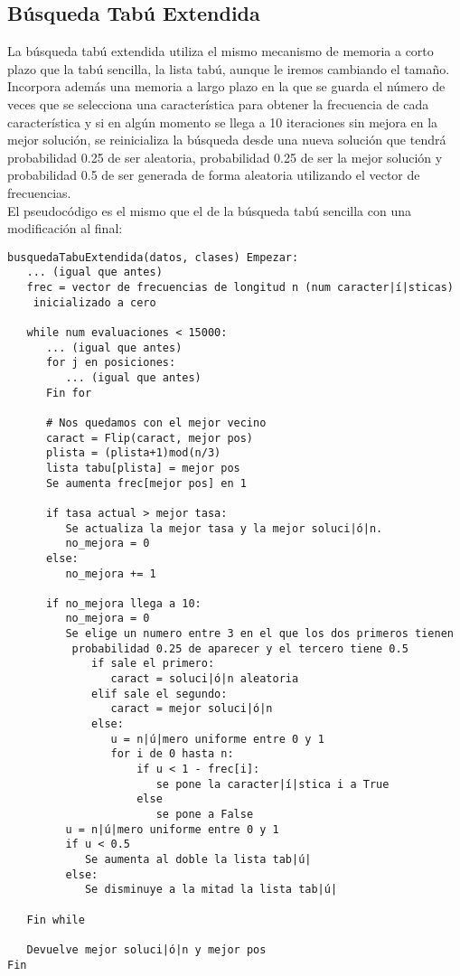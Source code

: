 \documentclass[12pt]{article}
\begin{document}
\subsection{Búsqueda Tabú Extendida}
La búsqueda tabú extendida utiliza el mismo mecanismo de memoria a corto plazo que la tabú sencilla, la lista tabú, aunque le iremos cambiando el tamaño. Incorpora además una memoria a largo plazo en la que se guarda el número de veces que se selecciona una característica para obtener la frecuencia de cada característica y si en algún momento se llega a 10 iteraciones sin mejora en la mejor solución, se reinicializa la búsqueda desde una nueva solución que tendrá probabilidad 0.25 de ser aleatoria, probabilidad 0.25 de ser la mejor solución y probabilidad 0.5 de ser generada de forma aleatoria utilizando el vector de frecuencias.\\

El pseudocódigo es el mismo que el de la búsqueda tabú sencilla con una modificación al final:

\begin{lstlisting}
busquedaTabuExtendida(datos, clases) Empezar:
   ... (igual que antes)
   frec = vector de frecuencias de longitud n (num caracter|í|sticas)
    inicializado a cero

   while num evaluaciones < 15000:
      ... (igual que antes)
      for j en posiciones:
         ... (igual que antes)
      Fin for
   
      # Nos quedamos con el mejor vecino
      caract = Flip(caract, mejor pos)
      plista = (plista+1)mod(n/3)
      lista tabu[plista] = mejor pos
      Se aumenta frec[mejor pos] en 1   
   
      if tasa actual > mejor tasa:
         Se actualiza la mejor tasa y la mejor soluci|ó|n.
         no_mejora = 0
      else:
         no_mejora += 1
   
      if no_mejora llega a 10:
         no_mejora = 0
         Se elige un numero entre 3 en el que los dos primeros tienen
          probabilidad 0.25 de aparecer y el tercero tiene 0.5
             if sale el primero:
                caract = soluci|ó|n aleatoria
             elif sale el segundo:
                caract = mejor soluci|ó|n
             else:
                u = n|ú|mero uniforme entre 0 y 1
                for i de 0 hasta n:
                    if u < 1 - frec[i]:
                       se pone la caracter|í|stica i a True
                    else
                       se pone a False
         u = n|ú|mero uniforme entre 0 y 1
         if u < 0.5
            Se aumenta al doble la lista tab|ú|
         else:
            Se disminuye a la mitad la lista tab|ú|

   Fin while
   
   Devuelve mejor soluci|ó|n y mejor pos
Fin

\end{lstlisting}
\end{document}
